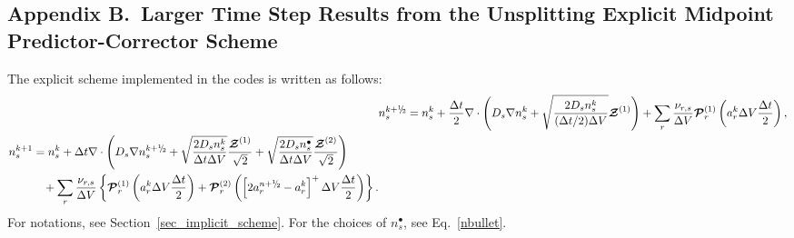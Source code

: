 \documentclass{article}
\def\mZb {\bm{\mathcal{Z}}}
\def\mPb {\bm{\mathcal{P}}}
\def\myhalf {\sfrac{1}{2}}
\newcommand{\sfrac}[2]{\mathchoice
  {\kern0em\raise.5ex\hbox{\the\scriptfont0 #1}\kern-.15em/
   \kern-.15em\lower.25ex\hbox{\the\scriptfont0 #2}}
  {\kern0em\raise.5ex\hbox{\the\scriptfont0 #1}\kern-.15em/
   \kern-.15em\lower.25ex\hbox{\the\scriptfont0 #2}}
  {\kern0em\raise.5ex\hbox{\the\scriptscriptfont0 #1}\kern-.2em/
   \kern-.15em\lower.25ex\hbox{\the\scriptscriptfont0 #2}}
  {#1\!/#2}}
\begin{document}
\clearpage

\subsection*{Appendix B.~Larger Time Step Results from the Unsplitting Explicit Midpoint Predictor-Corrector Scheme}

The explicit scheme implemented in the codes is written as follows:
\begin{subequations}
\begin{align}
&n_s^{k+\myhalf} = n_s^k + \frac{\Delta t}{2} \nabla\cdot\left(D_s\nabla n_s^k
+ \sqrt{\frac{2 D_s n_s^k}{(\Delta t/2)\Delta V}}\mZb^{(1)}\right)
+\sum_r \frac{\nu_{r,s}}{\Delta V}\mPb^{(1)}_r\left(a_r^k\Delta V\frac{\Delta t}{2}\right),\\
\begin{split}
&n_s^{k+1} = n_s^k + \Delta t \nabla\cdot\left(D_s \nabla n_s^{k+\myhalf}
+ \sqrt{\frac{2 D_s n_s^k}{\Delta t\Delta V}}\frac{\mZb^{(1)}}{\sqrt{2}}
+ \sqrt{\frac{2 D_s n_s^\bullet}{\Delta t\Delta V}}\frac{\mZb^{(2)}}{\sqrt{2}}\right)\\
&\quad\quad\quad+\sum_r \frac{\nu_{r,s}}{\Delta V}\left\{
\mPb^{(1)}_r\left(a_r^k\Delta V\frac{\Delta t}{2}\right)
+\mPb^{(2)}_r\left(\left[2 a_r^{n+\myhalf}-a_r^k\right]^+\Delta V\frac{\Delta t}{2}\right)\right\}.
\end{split}
\end{align}
\end{subequations}
For notations, see Section~\ref{sec_implicit_scheme}.
For the choices of $n_s^\bullet$, see Eq.~\eqref{nbullet}.
\end{document}
